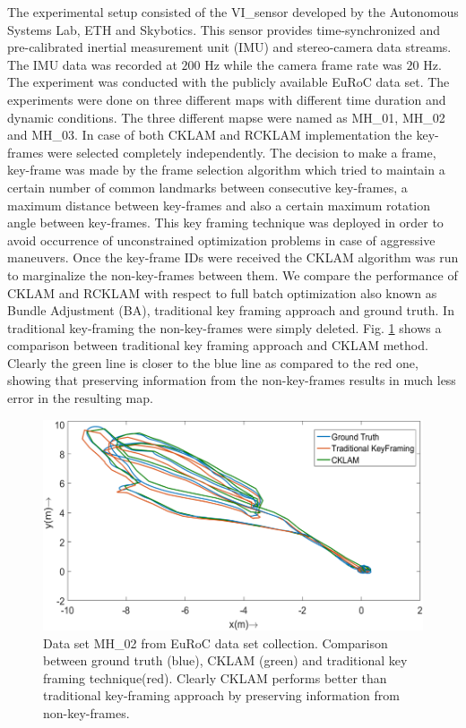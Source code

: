 The experimental setup consisted of the VI\_sensor \cite{6906892} developed by the Autonomous Systems Lab, ETH and Skybotics. This sensor provides time-synchronized and pre-calibrated inertial measurement unit (IMU) and stereo-camera data streams. The IMU data was recorded at $200$ Hz while the camera frame rate was $20$ Hz. The experiment was conducted with the publicly available EuRoC \cite{Burri25012016} data set. The experiments were done on three different maps with different time duration and dynamic conditions. The three different mapse were named as MH\_01, MH\_02 and MH\_03. In case of both CKLAM and RCKLAM implementation the key-frames were selected completely independently. The decision to make a frame, key-frame was made by the frame selection algorithm which tried to maintain a certain number of common landmarks between consecutive key-frames, a maximum distance between key-frames and also a certain maximum rotation angle between key-frames. This key framing technique was deployed in order to avoid occurrence of unconstrained optimization problems in case of aggressive maneuvers. Once the key-frame IDs were received the CKLAM algorithm was run to marginalize the non-key-frames between them. We compare the performance of CKLAM and RCKLAM with respect to full batch optimization also known as Bundle Adjustment (BA), traditional key framing approach and ground truth. In traditional key-framing the non-key-frames were simply deleted. Fig. \ref{fig:CKLAMvsGT} shows a comparison between traditional key framing approach and CKLAM method. Clearly the green line is closer to the blue line as compared to the red one, showing that preserving information from the non-key-frames results in much less error in the resulting map.

\begin{figure}
	\centering
		\includegraphics[width=1.00\textwidth]{images/CKLAMvsGT.png}
  \caption{Data set MH\_02 from EuRoC \cite{Burri25012016} data set collection. Comparison between ground truth (blue), CKLAM (green) and traditional key framing technique(red). Clearly CKLAM performs better than traditional key-framing approach by preserving information from non-key-frames.}
  \label{fig:CKLAMvsGT}
\end{figure}

